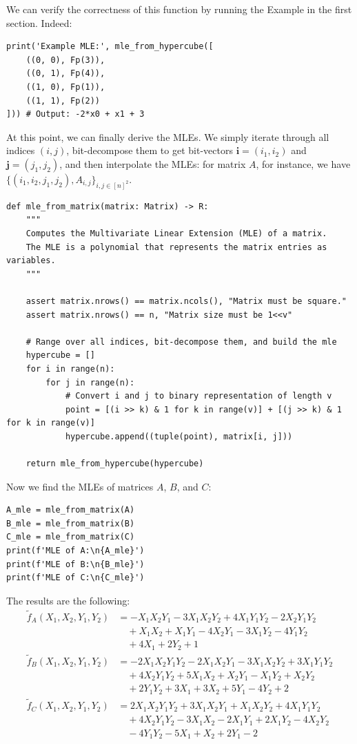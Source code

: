 We can verify the correctness of this function by running the Example in the
first section. Indeed:
\begin{verbatim}
print('Example MLE:', mle_from_hypercube([
    ((0, 0), Fp(3)),
    ((0, 1), Fp(4)),
    ((1, 0), Fp(1)),
    ((1, 1), Fp(2))
])) # Output: -2*x0 + x1 + 3
\end{verbatim}

At this point, we can finally derive the MLEs. We simply iterate through all
indices $(i,j)$, bit-decompose them to get bit-vectors
$\boldsymbol{i}=(i_1,i_2)$ and $\boldsymbol{j}=(j_1,j_2)$, and then interpolate
the MLEs: for matrix $A$, for instance, we have $\{(i_1,i_2,j_1,j_2),
A_{i,j}\}_{i,j \in [n]^2}$.
\begin{verbatim}
def mle_from_matrix(matrix: Matrix) -> R:
    """
    Computes the Multivariate Linear Extension (MLE) of a matrix.
    The MLE is a polynomial that represents the matrix entries as variables.
    """
    
    assert matrix.nrows() == matrix.ncols(), "Matrix must be square."
    assert matrix.nrows() == n, "Matrix size must be 1<<v"

    # Range over all indices, bit-decompose them, and build the mle
    hypercube = []
    for i in range(n):
        for j in range(n):
            # Convert i and j to binary representation of length v
            point = [(i >> k) & 1 for k in range(v)] + [(j >> k) & 1 for k in range(v)]
            hypercube.append((tuple(point), matrix[i, j]))

    return mle_from_hypercube(hypercube)
\end{verbatim}

Now we find the MLEs of matrices $A$, $B$, and $C$:
\begin{verbatim}
A_mle = mle_from_matrix(A)
B_mle = mle_from_matrix(B)
C_mle = mle_from_matrix(C)
print(f'MLE of A:\n{A_mle}')
print(f'MLE of B:\n{B_mle}')
print(f'MLE of C:\n{C_mle}')
\end{verbatim}

The results are the following:
\begin{align*}
\widetilde{f}_A(X_1,X_2,Y_1,Y_2) &= -X_1X_2Y_1 - 3X_1X_2Y_2 + 4X_1Y_1Y_2 - 2X_2Y_1Y_2 \\
& \quad + X_1X_2 + X_1Y_1 - 4X_2Y_1 - 3X_1Y_2 - 4Y_1Y_2 \\
& \quad + 4X_1 + 2Y_2 + 1 \\
\widetilde{f}_B(X_1,X_2,Y_1,Y_2) &= -2X_1X_2Y_1Y_2 - 2X_1X_2Y_1 - 3X_1X_2Y_2 + 3X_1Y_1Y_2 \\
& \quad + 4X_2Y_1Y_2 + 5X_1X_2 + X_2Y_1 - X_1Y_2 + X_2Y_2 \\
& \quad + 2Y_1Y_2 + 3X_1 + 3X_2 + 5Y_1 - 4Y_2 + 2 \\
\widetilde{f}_C(X_1,X_2,Y_1,Y_2) &= 2X_1X_2Y_1Y_2 + 3X_1X_2Y_1 + X_1X_2Y_2 + 4X_1Y_1Y_2 \\
& \quad + 4X_2Y_1Y_2 - 3X_1X_2 - 2X_1Y_1 + 2X_1Y_2 - 4X_2Y_2 \\
& \quad - 4Y_1Y_2 - 5X_1 + X_2 + 2Y_1 - 2
\end{align*}

